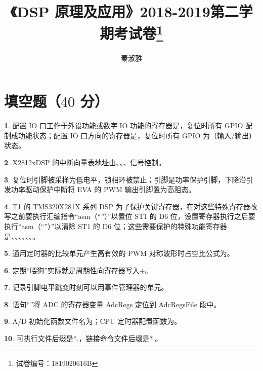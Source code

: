 \documentclass{ctexart}
\title{《DSP 原理及应用》2018-2019第二学期考试卷\thanks{试卷编号：1819020616B}}
\author{秦淑雅}
\theoremstyle{definition}
\newtheorem{ti}{}[section]
\def\hua{\uline{\hspace*{4pc}}}
\begin{document}
	\pagestyle{plain}
	\maketitle
	\section{填空题（$40$ 分）}
	\begin{ti}
		配置 IO 口工作于外设功能或数字 IO 功能的寄存器是\hua，复位时所有 GPIO 配制成\hua 功能状态；配置 IO 口方向的寄存器是\hua，复位时所有 GPIO 为\hua（输入/输出）状态。
	\end{ti}

	\begin{ti}
		X2812xDSP 的中断向量表地址由\hua、\hua、\hua、\hua 信号控制。
	\end{ti}

	\begin{ti}
		复位时\hua 引脚被采样为低电平，锁相环被禁止；\hua 引脚是功率保护引脚，下降沿引发功率驱动保护中断将 EVA 的 PWM 输出引脚置为高阻态。
	\end{ti}

	\begin{ti}
		T1 的 TMS320X281X 系列 DSP 为了保护关键寄存器，在对这些特殊寄存器改写之前要执行汇编指令“asm（“\hua”）”以置位 ST1 的 D6 位，设置寄存器执行之后要执行“asm（“\hua”）”以清除 ST1 的 D6 位；这些需要保护的特殊功能寄存器是\hua、\hua、\hua、\hua、\hua、\hua、\hua。
	\end{ti}

	\begin{ti}
		通用定时器的比较单元产生高有效的 PWM 对称波形时占空比公式为\hua。
	\end{ti}

	\begin{ti}
		定期“喂狗”实际就是周期性向\hua 寄存器写入\hua+\hua。
	\end{ti}

	\begin{ti}
		记录引脚电平跳变时刻可以用事件管理器的\hua 单元。
	\end{ti}

	\begin{ti}
		语句“\hua”将 ADC 的寄存器变量 AdcRegs 定位到 AdcRegsFile 段中。
	\end{ti}

	\begin{ti}
		A/D 初始化函数文件名为\hua；CPU 定时器配置函数为\hua。
	\end{ti}

	\begin{ti}
		可执行文件后缀是*.\hua，链接命令文件后缀是*.\hua。
	\end{ti}
\end{document}
